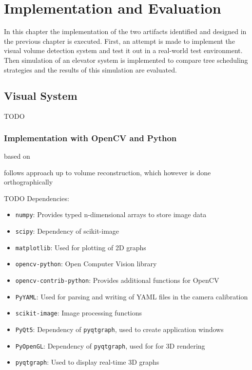 \chapter{Implementation and Evaluation}
\label{chap:impl}

In this chapter the implementation of the two artifacts identified and designed in the previous chapter is executed.
First, an attempt is made to implement the visual volume detection system and test it out in a real-world test environment.
Then simulation of an elevator system is implemented to compare tree scheduling strategies and the results of this simulation are evaluated.


\section{Visual System}
TODO
\subsection{Implementation with OpenCV and Python}



based on \autocite[][]{xocoatzin2013voxelcarving}

follows approach up to volume reconstruction, which however is done orthographically

TODO Dependencies:
\begin{itemize}[noitemsep]
    \item \texttt{numpy}:  Provides typed n-dimensional arrays to store image data
    \item \texttt{scipy}:  Dependency of scikit-image
    \item \texttt{matplotlib}: Used for plotting of 2D graphs
    \item \texttt{opencv-python}: Open Computer Vision library
    \item \texttt{opencv-contrib-python}: Provides additional functions for OpenCV
    \item \texttt{PyYAML}: Used for parsing and writing of \ac{YAML} files in the camera calibration
    \item \texttt{scikit-image}: Image processing functions  
    \item \texttt{PyQt5}: Dependency of \texttt{pyqtgraph}, used to create application windows
    \item \texttt{PyOpenGL}: Dependency of \texttt{pyqtgraph}, used for for \ac{3D} rendering 
    \item \texttt{pyqtgraph}: Used to display real-time 3D graphs
\end{itemize}

